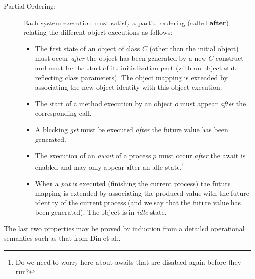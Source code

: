 \begin{description}
\item[Partial Ordering:]%
Each system execution  must satisfy a partial ordering 
(called \textbf{after}) relating the different object executions  as
follows: 
\begin{itemize}
\item The first state of an object of class $C$
(other than the initial object)
must occur \emph{after}
the object has been generated by a new $C$ construct
and must be the start of its initialization part (with an object state
reflecting class parameters). 
The object  mapping is extended
by associating the new object identity with this object execution.
\item The start of a method execution by an object $o$ must appear \emph{after} 
      the corresponding call.
\item A blocking \emph{get} must be executed \emph{after} 
      the future value has been generated.
\item 
The execution of  an \emph{await} of a process $p$
must occur \emph{after} the await is enabled 
and may only appear after an idle state.\footnote{Do we need to worry here about awaits that are disabled again before they run?}
\item When a \emph{put} is executed (finishing the current process) 
the future  mapping is extended by associating the produced
value with the  future identity of the current process (and we say that the future value has been
  generated). The object is in \emph{idle} state.
\end{itemize}
\end{description}
The last two properties  may be proved by induction from a detailed operational semantics
such as that from Din et al.\cite{Din12jlap}.

